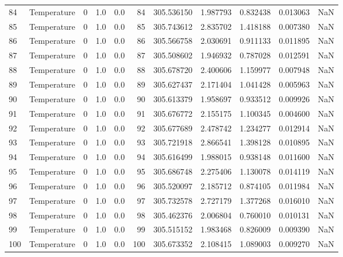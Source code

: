\begin{tabular}{llrrrrrrrrr}
84  &  Temperature &       0 &  1.0 &  0.0 &   84 &  305.536150 &  1.987793 &  0.832438 &   0.013063 &      NaN \\
85  &  Temperature &       0 &  1.0 &  0.0 &   85 &  305.743612 &  2.835702 &  1.418188 &   0.007380 &      NaN \\
86  &  Temperature &       0 &  1.0 &  0.0 &   86 &  305.566758 &  2.030691 &  0.911133 &   0.011895 &      NaN \\
87  &  Temperature &       0 &  1.0 &  0.0 &   87 &  305.508602 &  1.946932 &  0.787028 &   0.012591 &      NaN \\
88  &  Temperature &       0 &  1.0 &  0.0 &   88 &  305.678720 &  2.400606 &  1.159977 &   0.007948 &      NaN \\
89  &  Temperature &       0 &  1.0 &  0.0 &   89 &  305.627437 &  2.171404 &  1.041428 &   0.005963 &      NaN \\
90  &  Temperature &       0 &  1.0 &  0.0 &   90 &  305.613379 &  1.958697 &  0.933512 &   0.009926 &      NaN \\
91  &  Temperature &       0 &  1.0 &  0.0 &   91 &  305.676772 &  2.155175 &  1.100345 &   0.004600 &      NaN \\
92  &  Temperature &       0 &  1.0 &  0.0 &   92 &  305.677689 &  2.478742 &  1.234277 &   0.012914 &      NaN \\
93  &  Temperature &       0 &  1.0 &  0.0 &   93 &  305.721918 &  2.866541 &  1.398128 &   0.010895 &      NaN \\
94  &  Temperature &       0 &  1.0 &  0.0 &   94 &  305.616499 &  1.988015 &  0.938148 &   0.011600 &      NaN \\
95  &  Temperature &       0 &  1.0 &  0.0 &   95 &  305.686748 &  2.275406 &  1.130078 &   0.014119 &      NaN \\
96  &  Temperature &       0 &  1.0 &  0.0 &   96 &  305.520097 &  2.185712 &  0.874105 &   0.011984 &      NaN \\
97  &  Temperature &       0 &  1.0 &  0.0 &   97 &  305.732578 &  2.727179 &  1.377268 &   0.016010 &      NaN \\
98  &  Temperature &       0 &  1.0 &  0.0 &   98 &  305.462376 &  2.006804 &  0.760010 &   0.010131 &      NaN \\
99  &  Temperature &       0 &  1.0 &  0.0 &   99 &  305.515152 &  1.983468 &  0.826009 &   0.009390 &      NaN \\
100 &  Temperature &       0 &  1.0 &  0.0 &  100 &  305.673352 &  2.108415 &  1.089003 &   0.009270 &      NaN \\

\end{tabular}
